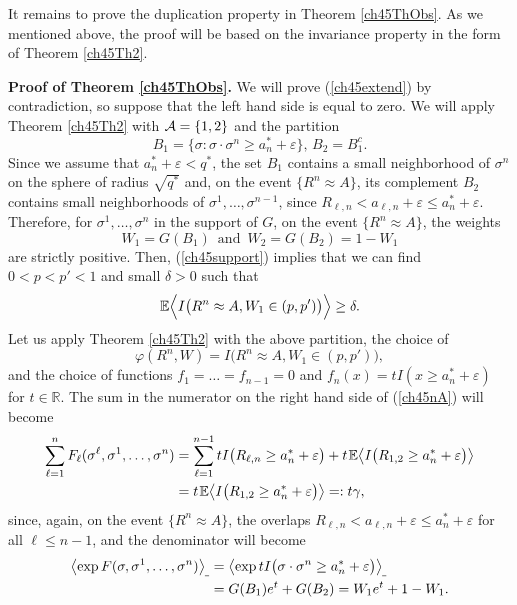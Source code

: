 \documentclass[12pt]{article}
\newcommand{\eps}{{\varepsilon}}
\newcommand{\e}{\mathbb{E}}
\newcommand{\Reals}{\mathbb{R}}
\newcommand{\la}{\langle}
\newcommand{\ra}{\rangle}
\theoremstyle{nonumberplain}
\begin{document}
\medskip
It remains to prove the duplication property in Theorem \ref{ch45ThObs}. As we mentioned above, the proof will be based on the invariance property in the form of Theorem \ref{ch45Th2}. 

\noindent\textbf{Proof of Theorem \ref{ch45ThObs}.}
We will prove (\ref{ch45extend}) by contradiction, so suppose that the left  hand side is equal to zero. We will apply Theorem \ref{ch45Th2} with ${\cal A}=\{1,2\}$ and the partition 
$$
B_1 = \bigl\{\sigma : \sigma\cdot \sigma^n \geq a_n^* +\eps \bigr\},\, 
B_2 = B_1^c.
$$ 
Since we assume that $a_n^* +\eps < q^*$, the set $B_1$ contains a small neighborhood of $\sigma^n$ on the sphere of radius $\sqrt{q^*}$ and, on the event $\{R^n\approx A\}$, its complement $B_2$ contains small neighborhoods of $\sigma^1,\ldots,\sigma^{n-1}$, since $R_{\ell,n}<a_{\ell,n}+\eps \leq a_n^* +\eps.$ Therefore, for $\sigma^1,\ldots,\sigma^n$ in the support of $G$, on the event $\{R^n\approx A\}$, the weights  
$$
W_1=G(B_1) \,\mbox{ and }\, W_2 = G(B_2)=1-W_1
$$ 
are strictly positive. Then, (\ref{ch45support}) implies that we can find $0<p<p'<1$ and small $\delta>0$ such that 
\begin{equation}
\e\Bigl\la
I\bigl(
R^n\approx A, W_1 \in (p,p')
\bigr)
\Bigr\ra \geq \delta.
\label{ch45littlec}
\end{equation}
Let us apply Theorem \ref{ch45Th2} with the above partition, the choice of 
\begin{equation}
\varphi(R^n,W) = I\bigl(R^n\approx A, W_1 \in (p,p')\bigr),
\end{equation}
and the choice of functions $f_1=\ldots=f_{n-1}=0$ and $f_{n}(x) = t I(x\geq a_n^*+\eps)$ 
for $t\in\Reals$. The sum in the numerator on the right hand side of (\ref{ch45nA}) will become 
\begin{align}
\sum_{\ell=1}^{n} F_{\ell}(\sigma^{\ell},\sigma^1,\ldots,\sigma^n) 
& = 
\sum_{\ell=1}^{n-1} t  I\bigl(R_{\ell,n} \geq a_n^*+\eps\bigr)
+
t\hspace{0.3mm}  \e \bigl\la I\bigl(R_{1,2}\geq a_n^* + \eps\bigr)\bigr \ra
\nonumber
\\
& = 
t\hspace{0.3mm} \e \bigl\la I\bigl(R_{1,2}\geq a_n^* + \eps\bigr)\bigr \ra =: t\gamma,
\nonumber
\end{align}
since, again, on the event $\{R^n\approx A\}$, the overlaps $R_{\ell,n}< a_{\ell,n}+\eps \leq a_n^*+\eps$ for all $\ell\leq n-1$, and the denominator will become
\begin{align}
\bigl \la \exp F(\sigma,\sigma^1,\ldots,\sigma^n) \bigr \ra_{\hspace{-0.3mm}\mathunderscore} 
&=
\bigl \la \exp t I\bigl(\sigma\cdot \sigma^n \geq a_n^*+\eps\bigr)  \bigr\ra_{\hspace{-0.3mm}\mathunderscore} 
\nonumber
\\
&=
G(B_1) e^t + G(B_2) =W_1 e^t + 1-W_1.
\label{ch45DeltatW}
\end{align}
\end{document}
